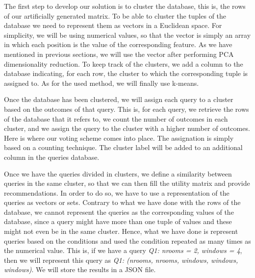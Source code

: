 \documentclass[sigconf]{acmart}
\begin{document}
The first step to develop our solution is to cluster the database, this is, the rows of our artificially generated matrix. To be able to cluster the tuples of the database we need to represent them as vectors in a Euclidean space. For simplicity, we will be using numerical values, so that the vector is simply an array in which each position is the value of the corresponding feature. As we have mentioned in previous sections, we will use the vector after performing PCA dimensionality reduction. To keep track of the clusters, we add a column to the database indicating, for each row, the cluster to which the corresponding tuple is assigned to. As for the used method, we will finally use k-means.

Once the database has been clustered, we will assign each query to a cluster based on the outcomes of that query. This is, for each query, we retrieve the rows of the database that it refers to, we count the number of outcomes in each cluster, and we assign the query to the cluster with a higher number of outcomes. Here is where our voting scheme comes into place. The assignation is simply based on a counting technique. The cluster label will be added to an additional column in the queries database.

Once we have the queries divided in clusters, we define a similarity between queries in the same cluster, so that we can then fill the utility matrix and provide recommendations. In order to do so, we have to use a representation of the queries as vectors or sets. Contrary to what we have done with the rows of the database, we cannot represent the queries as the corresponding values of the database, since a query might have more than one tuple of values and these might not even be in the same cluster. Hence, what we have done is represent queries based on the conditions and used the condition repeated as many times as the numerical value. This is, if we have a query \textit{Q1: nrooms = 2, windows = 4}, then we will represent this query as \textit{Q1: (nrooms, nrooms, windows, windows, windows)}. We will store the results in a JSON file.
\end{document}
